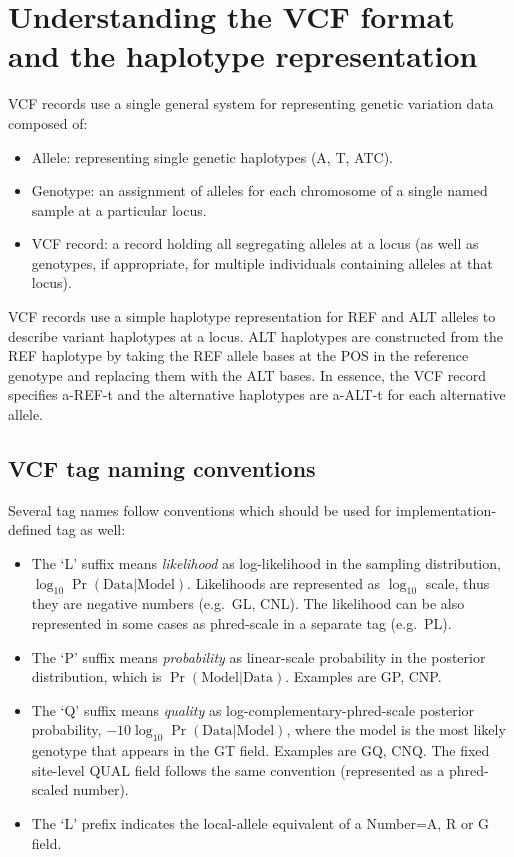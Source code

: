 \documentclass[8pt]{article}
\begin{document}
\section{Understanding the VCF format and the haplotype representation}
VCF records use a single general system for representing genetic variation data composed of:
\begin{itemize}
  \item Allele: representing single genetic haplotypes (A, T, ATC).
  \item Genotype: an assignment of alleles for each chromosome of a single named sample at a particular locus.
  \item VCF record: a record holding all segregating alleles at a locus (as well as genotypes, if appropriate, for multiple individuals containing alleles at that locus).
\end{itemize}
VCF records use a simple haplotype representation for REF and ALT alleles to describe variant haplotypes at a locus.
ALT haplotypes are constructed from the REF haplotype by taking the REF allele bases at the POS in the reference genotype and replacing them with the ALT bases.
In essence, the VCF record specifies a-REF-t and the alternative haplotypes are a-ALT-t for each alternative allele.

\subsection{VCF tag naming conventions}
Several tag names follow conventions which should be used for implementation-defined tag as well:
\begin{itemize}
    \item The `L' suffix means \emph{likelihood} as log-likelihood in the sampling distribution, $\log_{10} \Pr(\mathrm{Data}|\mathrm{Model})$.
    Likelihoods are represented as $\log_{10}$ scale, thus they are negative numbers (e.g.\ GL, CNL).
    The likelihood can be also represented in some cases as phred-scale in a separate tag (e.g.\ PL).

    \item The `P' suffix means \emph{probability} as linear-scale probability in the posterior distribution, which is $\Pr(\mathrm{Model}|\mathrm{Data})$. Examples are GP, CNP.

    \item The `Q' suffix means \emph{quality} as log-complementary-phred-scale posterior probability, $-10 \log_{10} \Pr(\mathrm{Data}|\mathrm{Model})$, where the model is the most likely genotype that appears in the GT field.
    Examples are GQ, CNQ.
    The fixed site-level QUAL field follows the same convention (represented as a phred-scaled number).

	\item The `L' prefix indicates the local-allele equivalent of a Number=A, R or G field.
\end{itemize}
\end{document}
